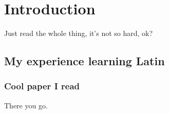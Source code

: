 

\Clear
\chapter{Introduction}
\label{cha:introduction}

Just read the whole thing, it's not so hard, ok?

\section{My experience learning Latin}
\label{sec:my_experience_learning_latin}

\lipsum[1]

\subsection{Cool paper I read}
\label{sub:cool_paper_i_read}

There you go\cite{Eigler.Schweizer:1990}.


